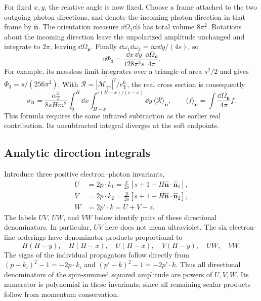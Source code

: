 For fixed $x,y$, the relative angle is now fixed. Choose a frame
attached to the two outgoing photon directions, and denote the incoming
photon direction in that frame by $\widehat{\bm n}$. The orientation
measure $\dd\Omega_1\dd\phi$ has total volume $8\pi^2$.
Rotations about the incoming direction leave the unpolarized amplitude
unchanged and integrate to $2\pi$, leaving $\dd\Omega_{\bm n}$.
Finally $\dd\omega_1\dd\omega_2=\dd x\dd y/(4s)$, so
\begin{equation}
 \dd\Phi_3=\frac{\dd x\,\dd y}{128\pi^3s}
                    \frac{\dd\Omega_{\bm n}}{4\pi}.
 \label{eq:comp-real-dalitz-measure}
\end{equation}
For example, its massless limit integrates over a triangle of area
$s^2/2$ and gives $\Phi_3=s/(256\pi^3)$.
With $\mathcal R=\overline{|\mathcal M_{\gamma\gamma}|^2}/e_{\mathrm T}^6$,
the real cross section is consequently
\begin{equation}
 \sigma_{\mathrm R}=\frac{\alpha_{\mathrm T}^3}{8sH m^2}
 \int_0^H\dd x\int_{H-x}^{s(H-x)/(s-x)}\dd y\,
 \langle\mathcal R\rangle_{\bm n},\qquad
 \langle f\rangle_{\bm n}=\int\frac{\dd\Omega_{\bm n}}{4\pi}f.
 \label{eq:comp-real-dalitz-cross-section}
\end{equation}
This formula requires the same infrared subtraction as the earlier
real contribution. Its unsubtracted integral diverges at the soft
endpoints.

\subsection{Analytic direction integrals}
Introduce three positive electron--photon invariants,
\begin{align}
 U&=2p\cdot k_1=\frac{x}{2s}
       [s+1+H\widehat{\bm n}\cdot\widehat{\bm n}_1],\\
 V&=2p\cdot k_2=\frac{y}{2s}
       [s+1+H\widehat{\bm n}\cdot\widehat{\bm n}_2],\\
 W&=2p'\cdot k=U+V-z.
 \label{eq:comp-real-angular-denominators}
\end{align}
The labels $UV$, $UW$, and $VW$ below identify pairs of these
directional denominators. In particular, $UV$ here does not mean
ultraviolet. The six electron-line orderings have denominator products
proportional to
\begin{equation}
 H(H-y),\quad H(H-x),\quad U(H-x),\quad V(H-y),
 \quad UW,\quad VW.
\end{equation}
The signs of the individual propagators follow directly from
$(p-k_i)^2-1=-2p\cdot k_i$ and
$(p'-k)^2-1=-2p'\cdot k$.
Thus all directional denominators of the spin-summed squared
amplitude are powers of $U,V,W$. Its numerator is polynomial in
these invariants, since all remaining scalar products follow from
momentum conservation.

